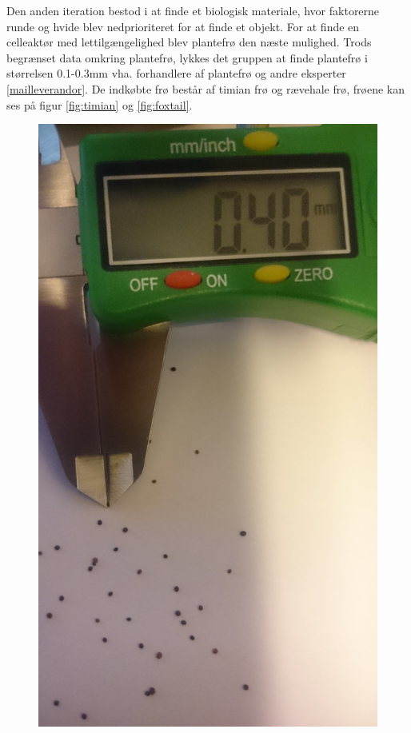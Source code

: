 Den anden iteration bestod i at finde et biologisk materiale, hvor faktorerne runde og hvide blev nedprioriteret for at finde et objekt. For at finde en celleaktør med lettilgængelighed blev plantefrø den næste mulighed. Trods begrænset data omkring plantefrø, lykkes det gruppen at finde plantefrø i størrelsen 0.1-0.3mm vha. forhandlere af plantefrø og andre eksperter \ref{mailleverandor}. De indkøbte frø består af timian frø og rævehale frø, frøene kan ses på figur \ref{fig:timian} og \ref{fig:foxtail}.

 \begin{figure}[htbp] \centering
\begin{minipage}[b]{0.48\textwidth} \centering
\includegraphics[width=1.00\textwidth]{billeder/Hovedrapport/timian.jpg} %

\end{minipage}
\end{figure}

